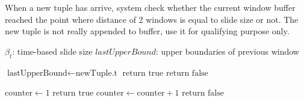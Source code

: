 \begin{algorithm}
\caption{Trigger a new window if full }
\label{algorithm:notifyTrigger}
When a new tuple has arrive, system check whether the current window buffer reached the point where distance of 2 windows is equal to slide size or not. The new tuple is not really appended to buffer, use it for qualifying purpose only.
\begin{algorithmic}[1]
  			{$\beta_t$: time-based slide size }
  			{$lastUpperBound$: upper boundaries of previous window}
    
   
    
    			\State $\textrm{lastUpperBound} \gets \textrm{newTuple.t}$
    			\State $\textrm{return true}$
    		\Else
    			\State$\textrm{return false}$
    		\EndIf
    
    \Else {}
    			\State $\textrm{counter} \gets 1$
    			\State $\textrm{return true}$
    		\Else
    			\State $\textrm{counter} \gets \textrm{counter} + 1$
    			\State $\textrm{return false}$
    		\EndIf
    	\EndIf
    
    
    \EndProcedure
  \end{algorithmic}
\end{algorithm}

